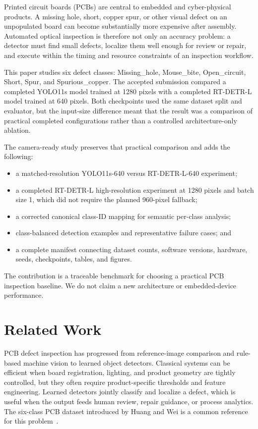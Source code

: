 \documentclass[runningheads]{llncs}
\begin{document}
Printed circuit boards (PCBs) are central to embedded and cyber-physical
products. A missing hole, short, copper spur, or other visual defect on
an unpopulated board can become substantially more expensive after
assembly. Automated optical inspection is therefore not only an
accuracy problem: a detector must find small defects, localize them
well enough for review or repair, and execute within the timing and
resource constraints of an inspection workflow.

This paper studies six defect classes: Missing\_hole, Mouse\_bite,
Open\_circuit, Short, Spur, and Spurious\_copper. The accepted
submission compared a completed YOLO11s model trained at 1280 pixels
with a completed RT-DETR-L model trained at 640 pixels. Both checkpoints
used the same dataset split and evaluator, but the input-size difference
meant that the result was a comparison of practical completed
configurations rather than a controlled architecture-only ablation.

The camera-ready study preserves that practical comparison and adds
the following:

\begin{itemize}
\item a matched-resolution YOLO11s-640 versus RT-DETR-L-640 experiment;
\item a completed RT-DETR-L high-resolution experiment at 1280 pixels
and batch size 1, which did not require the planned 960-pixel fallback;
\item a corrected canonical class-ID mapping for semantic per-class
analysis;
\item class-balanced detection examples and representative failure
cases; and
\item a complete manifest connecting dataset counts, software versions,
hardware, seeds, checkpoints, tables, and figures.
\end{itemize}

The contribution is a traceable benchmark for choosing a practical
PCB inspection baseline. We do not claim a new architecture or
embedded-device performance.

\section{Related Work}

PCB defect inspection has progressed from reference-image comparison
and rule-based machine vision to learned object detectors. Classical
systems can be efficient when board registration, lighting, and product
geometry are tightly controlled, but they often require product-specific
thresholds and feature engineering. Learned detectors jointly classify
and localize a defect, which is useful when the output feeds human
review, repair guidance, or process analytics. The six-class PCB
dataset introduced by Huang and Wei is a common reference for this
problem~\cite{huang2019pcb}.
\end{document}
